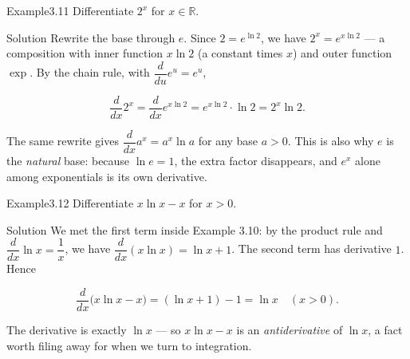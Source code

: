 \begin{hkworkedexample}
\begin{hkexample}{Example}{3.11}{}
Differentiate \(2^{x}\) for \(x \in \mathbb{R}\).
\end{hkexample}
\begin{hksolution}{Solution}{}{}
Rewrite the base through \(e\). Since \(2 = e^{\ln 2}\), we have \(2^{x} = e^{x\ln 2}\) — a composition with inner function \(x\ln 2\) (a constant times \(x\)) and outer function \(\exp\). By the chain rule, with \(\dfrac{d}{du}e^{u} = e^{u}\),

\[ \frac{d}{dx}2^{x} = \frac{d}{dx}e^{x\ln 2} = e^{x\ln 2}\cdot\ln 2 = 2^{x}\ln 2. \]

The same rewrite gives \(\dfrac{d}{dx}a^{x} = a^{x}\ln a\) for any base \(a > 0\). This is also why \(e\) is the \emph{natural} base: because \(\ln e = 1\), the extra factor disappears, and \(e^{x}\) alone among exponentials is its own derivative.
\end{hksolution}
\end{hkworkedexample}
\begin{hkworkedexample}
\begin{hkexample}{Example}{3.12}{}
Differentiate \(x\ln x - x\) for \(x > 0\).
\end{hkexample}
\begin{hksolution}{Solution}{}{}
We met the first term inside Example 3.10: by the product rule and \(\dfrac{d}{dx}\ln x = \dfrac{1}{x}\), we have \(\dfrac{d}{dx}(x\ln x) = \ln x + 1\). The second term has derivative \(1\). Hence

\[ \frac{d}{dx}\bigl(x\ln x - x\bigr) = (\ln x + 1) - 1 = \ln x \quad (x > 0). \]

The derivative is exactly \(\ln x\) — so \(x\ln x - x\) is an \emph{antiderivative} of \(\ln x\), a fact worth filing away for when we turn to integration.
\end{hksolution}
\end{hkworkedexample}
